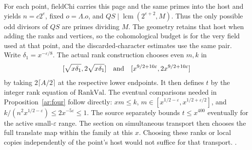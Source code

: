 For each point, \(\mathrm{fieldChi}\) carries this page and the same primes into the host and yields \(n=c2^e\), fixed \(o=\Lambda.o\), and \(QS\mid\operatorname{lcm}(2^{e+2},M)\). Thus the only possible odd divisors of \(QS\) are primes dividing \(M\). The geometry retains that host when adding the ranks and vertices, so the cohomological budget is for the very field used at that point, and the discarded-character estimates use the same pair. Write \(\delta_1=x^{-\varepsilon/8}\). The actual rank construction chooses even \(m,k\) in
\[
 [\sqrt{x\delta_1},2\sqrt{x\delta_1}]\quad\hbox{and}\quad
 [x^{9/2+10\varepsilon},2x^{9/2+10\varepsilon}]
\]
by taking \(2\lceil A/2\rceil\) at the respective lower endpoints. It then defines \(t\) by the integer rank equation of \(\mathrm{RankVal}\). The eventual comparisons needed in Proposition~\ref{ar:four} follow directly: \(xm\le k\), \(m\in[x^{1/2-\varepsilon},x^{1/2+\varepsilon/2}]\), and \(k/(n^2x^{1/2-\varepsilon})\le 2x^{-5\varepsilon}\le1\). The source separately bounds \(t\le x^{400}\) eventually for the active small-\(\varepsilon\) range. The section on simultaneous transport then chooses the full translate map within the family at this \(x\). Choosing these ranks or local copies independently of the point's host would not suffice for that transport. \quad
{}\quad
{}\quad
{}.


